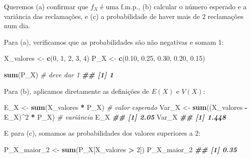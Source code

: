 \documentclass[
  portuguese,
  11pt,
  openany]{book}
\newenvironment{Shaded}{\begin{snugshade}}{\end{snugshade}}
\newcommand{\CommentTok}[1]{\textcolor[rgb]{0.56,0.35,0.01}{\textit{#1}}}
\newcommand{\DecValTok}[1]{\textcolor[rgb]{0.00,0.00,0.81}{#1}}
\newcommand{\DocumentationTok}[1]{\textcolor[rgb]{0.56,0.35,0.01}{\textbf{\textit{#1}}}}
\newcommand{\FloatTok}[1]{\textcolor[rgb]{0.00,0.00,0.81}{#1}}
\newcommand{\FunctionTok}[1]{\textcolor[rgb]{0.13,0.29,0.53}{\textbf{#1}}}
\newcommand{\NormalTok}[1]{#1}
\newcommand{\OtherTok}[1]{\textcolor[rgb]{0.56,0.35,0.01}{#1}}
\newcommand{\SpecialCharTok}[1]{\textcolor[rgb]{0.81,0.36,0.00}{\textbf{#1}}}
\begin{document}
Queremos (a) confirmar que \(f_X\) é uma f.m.p., (b) calcular o número esperado e a
variância das reclamações, e (c) a probabilidade de haver mais de 2 reclamações num dia.

Para (a), verificamos que as probabilidades são não negativas e somam 1:

\begin{Shaded}
\begin{Highlighting}[]
\NormalTok{X\_valores }\OtherTok{\textless{}{-}} \FunctionTok{c}\NormalTok{(}\DecValTok{0}\NormalTok{, }\DecValTok{1}\NormalTok{, }\DecValTok{2}\NormalTok{, }\DecValTok{3}\NormalTok{, }\DecValTok{4}\NormalTok{)}
\NormalTok{P\_X }\OtherTok{\textless{}{-}} \FunctionTok{c}\NormalTok{(}\FloatTok{0.10}\NormalTok{, }\FloatTok{0.25}\NormalTok{, }\FloatTok{0.30}\NormalTok{, }\FloatTok{0.20}\NormalTok{, }\FloatTok{0.15}\NormalTok{)}

\FunctionTok{sum}\NormalTok{(P\_X)          }\CommentTok{\# deve dar 1}
\DocumentationTok{\#\# [1] 1}
\end{Highlighting}
\end{Shaded}

Para (b), aplicamos diretamente as definições de \(E(X)\) e \(V(X)\):

\begin{Shaded}
\begin{Highlighting}[]
\NormalTok{E\_X   }\OtherTok{\textless{}{-}} \FunctionTok{sum}\NormalTok{(X\_valores }\SpecialCharTok{*}\NormalTok{ P\_X)                 }\CommentTok{\# valor esperado}
\NormalTok{Var\_X }\OtherTok{\textless{}{-}} \FunctionTok{sum}\NormalTok{((X\_valores }\SpecialCharTok{{-}}\NormalTok{ E\_X)}\SpecialCharTok{\^{}}\DecValTok{2} \SpecialCharTok{*}\NormalTok{ P\_X)       }\CommentTok{\# variância}
\NormalTok{E\_X}
\DocumentationTok{\#\# [1] 2.05}
\NormalTok{Var\_X}
\DocumentationTok{\#\# [1] 1.448}
\end{Highlighting}
\end{Shaded}

E para (c), somamos as probabilidades dos valores superiores a 2:

\begin{Shaded}
\begin{Highlighting}[]
\NormalTok{P\_X\_maior\_2 }\OtherTok{\textless{}{-}} \FunctionTok{sum}\NormalTok{(P\_X[X\_valores }\SpecialCharTok{\textgreater{}} \DecValTok{2}\NormalTok{])}
\NormalTok{P\_X\_maior\_2}
\DocumentationTok{\#\# [1] 0.35}
\end{Highlighting}
\end{Shaded}
\end{document}
